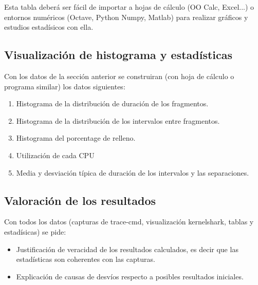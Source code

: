 \documentclass[a4paper,11pt,spanish,twoside]{article}
\begin{document}
Esta tabla deberá ser fácil de importar a hojas de cálculo (OO Calc,
Excel...) o entornos numéricos (Octave, Python Numpy, Matlab) para
realizar gráficos y estudios estadísicos con ella.

\subsection{Visualización de histograma y estadísticas}
\label{sec:estadistica}

Con los datos de la sección anterior se construiran (con hoja de
cálculo o programa similar) los datos siguientes:

\begin{enumerate}
\item Histograma de la distribución de duración de los fragmentos.
\item Histograma de la distribución de los intervalos entre
  fragmentos.
\item Histograma del porcentage de relleno.
\item Utilización de cada CPU
\item Media y desviación típica de duración de los intervalos y las
  separaciones.

\end{enumerate}

\subsection{Valoración de los resultados}
\label{sec:valoracion}

Con todos los datos (capturas de trace-cmd, visualización kernelshark,
tablas y estadísicas) se pide:

\begin{itemize}
\item Justificación de veracidad de los resultados calculados, es
  decir que las estadísticas son coherentes con las capturas.

\item Explicación de causas de desvíos respecto a posibles resultados
  iniciales.
\end{itemize}




% 
% 
\end{document}
